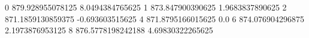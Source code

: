 0 879.928955078125 8.0494384765625
1 873.847900390625 1.9683837890625
2 871.1859130859375 -0.693603515625
4 871.8795166015625 0.0
6 874.076904296875 2.1973876953125
8 876.5778198242188 4.69830322265625
